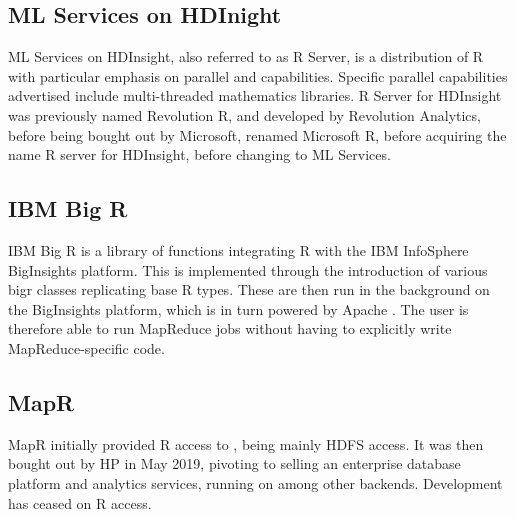 \hypertarget{sec:r-server-hdinsight}{%
    \subsection{ML Services on HDInight}\label{sec:r-server-hdinsight}}

ML Services on HDInsight, also referred to as R Server, is a
distribution of R with particular emphasis on parallel and
capabilities\cite{azure16:_r_server_hdins_r_analy}. Specific
parallel capabilities advertised include multi-threaded mathematics
libraries. R Server for HDInsight was previously named Revolution R, and
developed by Revolution Analytics, before being bought out by Microsoft,
renamed Microsoft R, before acquiring the name R server for HDInsight,
before changing to ML Services.

\hypertarget{sec:ibm-big-r}{%
    \subsection{IBM Big R}\label{sec:ibm-big-r}}

IBM Big R is a library of functions integrating R with the IBM
InfoSphere BigInsights platform\cite{inc.14:_infos_bigin_big_r}.
This is implemented through the introduction of various bigr classes
replicating base R types. These are then run in the background on the
BigInsights platform, which is in turn powered by Apache . The
user is therefore able to run MapReduce jobs without having to
explicitly write MapReduce-specific code.

\hypertarget{sec:mapr}{%
    \subsection{MapR}\label{sec:mapr}}

MapR initially provided R access to , being mainly HDFS
access\cite{mapr19:_indus_next_gener_data_platf_ai_analy}. It was
then bought out by HP in May 2019, pivoting to selling an enterprise
database platform and analytics services, running on  among other
backends. Development has ceased on R access.

